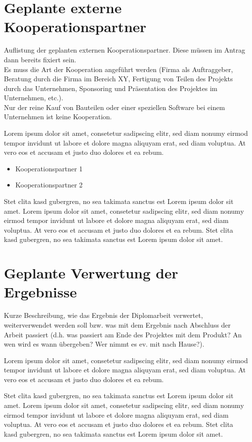 \documentclass[
	headings=optiontotocandhead,%
	oneside,
	numbers=noenddot,%
	toc=flat, %
	10pt, %
	parskip=full, %
	listof=totoc, %
	listof=flat, %
	numbers=noenddot, %
	bibliography=totoc, %
	a4paper,DIV=14,
]{scrartcl}
\begin{document}
\newpage
\section{Geplante externe Kooperationspartner}
Auflistung der geplanten externen Kooperationspartner. Diese müssen im Antrag dann bereits fixiert sein.\\
Es muss die Art der Kooperation angeführt werden (Firma als Auftraggeber, Beratung durch die Firma im Bereich XY, Fertigung von Teilen des Projekts durch das Unternehmen, Sponsoring und Präsentation des Projektes im Unternehmen, etc.).\\
Nur der reine Kauf von Bauteilen oder einer speziellen Software bei einem Unternehmen ist keine Kooperation.

Lorem ipsum dolor sit amet, consetetur sadipscing elitr, sed diam nonumy eirmod tempor invidunt ut labore et dolore magna aliquyam erat, sed diam voluptua. At vero eos et accusam et justo duo dolores et ea rebum. 
\begin{itemize}
	\item{Kooperationspartner 1}
	\item{Kooperationspartner 2}
\end{itemize}
Stet clita kasd gubergren, no sea takimata sanctus est Lorem ipsum dolor sit amet. Lorem ipsum dolor sit amet, consetetur sadipscing elitr, sed diam nonumy eirmod tempor invidunt ut labore et dolore magna aliquyam erat, sed diam voluptua. At vero eos et accusam et justo duo dolores et ea rebum. Stet clita kasd gubergren, no sea takimata sanctus est Lorem ipsum dolor sit amet.

\newpage
\section{Geplante Verwertung der Ergebnisse}
Kurze Beschreibung, wie das Ergebnis der Diplomarbeit verwertet, weiterverwendet werden soll bzw. was mit dem Ergebnis nach Abschluss der Arbeit passiert (d.h. was passiert am Ende des Projektes mit dem Produkt? An wen wird es wann übergeben? Wer nimmt es ev. mit nach Hause?).

Lorem ipsum dolor sit amet, consetetur sadipscing elitr, sed diam nonumy eirmod tempor invidunt ut labore et dolore magna aliquyam erat, sed diam voluptua. At vero eos et accusam et justo duo dolores et ea rebum. 

Stet clita kasd gubergren, no sea takimata sanctus est Lorem ipsum dolor sit amet. Lorem ipsum dolor sit amet, consetetur sadipscing elitr, sed diam nonumy eirmod tempor invidunt ut labore et dolore magna aliquyam erat, sed diam voluptua. At vero eos et accusam et justo duo dolores et ea rebum. Stet clita kasd gubergren, no sea takimata sanctus est Lorem ipsum dolor sit amet.
\end{document}
